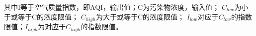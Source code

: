\documentclass[preview]{standalone}
\begin{document}
\begin{center}
其中I等于空气质量指数，即AQI，输出值；C为污染物浓度，输入值； $C_{low}$为小于或等于C的浓度限值； $C_{high}$为大于或等于C的浓度限值； $I_{low}$对应于$C_{low}$的指数限值；$I_{high}$为对应于$C_{high}$的指数限值。
\end{center}
\end{document}
